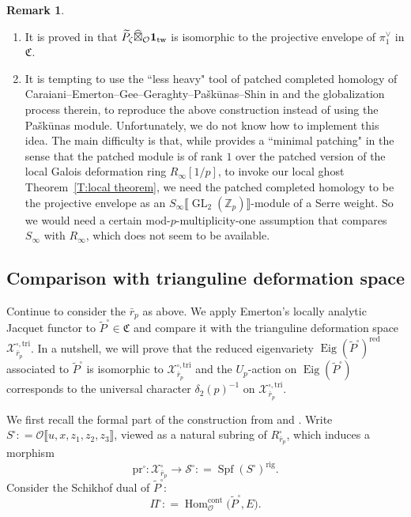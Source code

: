 \documentclass[12pt]{amsart}
\theoremstyle{definition}
\newtheorem{remark}[subsection]{Remark}
\numberwithin{equation}{subsection}
\def\calO{\mathcal{O}}
\def\calS{\mathcal{S}}
\def\calX{\mathcal{X}}
\def\gothC{\mathfrak{C}}
\def\ZZ{\mathbb{Z}}
\DeclareMathOperator{\GL}{GL}
\DeclareMathOperator{\Hom}{Hom}
\DeclareMathOperator{\Spf}{Spf}
\newcommand{\cont}{\mathrm{cont}}
\newcommand{\pr}{\mathrm{pr}}
\newcommand{\rig}{\mathrm{rig}}
\newcommand{\tri}{\mathrm{tri}}
\DeclareMathOperator{\Eig}{Eig}
\begin{document}
\begin{remark}
\begin{enumerate}
\item 
It is proved in \cite[Theorem~6.18]{six author2} that  $\widetilde P_\zeta \widehat \boxtimes_\calO {\bf 1}_\mathrm{tw}$ is isomorphic to the projective envelope of $\pi_1^\vee$ in $\gothC$.
\item
It is tempting to use the ``less heavy" tool of patched completed homology of Caraiani--Emerton--Gee--Geraghty--Pa\v sk\= unas--Shin in \cite{six author} and the globalization process therein, to reproduce the above construction instead of using the Pa\v sk\= unas module.  Unfortunately, we do not know how to implement this idea. The main difficulty is that, while \cite{six author} provides a ``minimal patching" in the sense that the patched module is of rank $1$ over the patched version of the local Galois deformation ring $R_\infty[1/p]$, to invoke our local ghost Theorem~\ref{T:local theorem}, we need the patched completed homology to be the projective envelope as an $S_\infty \llbracket \GL_2(\ZZ_p)\rrbracket$-module of a Serre weight. So we would need a certain mod-$p$-multiplicity-one assumption that compares $S_\infty$ with $R_\infty$, which does not seem to be available.
\end{enumerate}
\end{remark}


\subsection{Comparison with trianguline deformation space}
\label{S:comparison with trianguline deformation}
Continue to consider the $\bar r_p$ as above.
We apply Emerton's locally analytic Jacquet functor \cite{emerton-Jacquet} to $\widetilde P^\square \in \gothC$ and compare it with the trianguline deformation space $\calX_{\bar r_p}^{\square, \tri}$.  In a nutshell, we will prove that the reduced eigenvariety $\Eig(\widetilde P^\square)^\mathrm{red}$ associated to $\widetilde P^\square$ is isomorphic to $\calX_{\bar r_p}^{\square, \tri}$ and the $U_p$-action on $\Eig(\widetilde P^\square)$ corresponds to the universal character $\delta_2(p)^{-1}$ on $\calX_{\bar r_p}^{\square, \tri}$.

We first recall the formal part of the construction from \cite[\S\,3]{breuil-hellmann-schraen} and \cite[\S\,A.4]{breuil-ding}. Write $S^\square: = \calO\llbracket u,x,z_1, z_2 , z_3\rrbracket$, viewed as a natural subring of $R_{\bar r_p}^\square$, which induces a morphism
$$\pr^\square:
\calX_{\bar r_p}^\square \to \calS^\square: = \Spf(S^\square)^\rig.
$$
Consider the Schikhof dual of $\widetilde P^\square$:
$$
\Pi^\square: = \Hom_\calO^\cont\big( \widetilde P^\square, E\big).
$$
\end{document}
